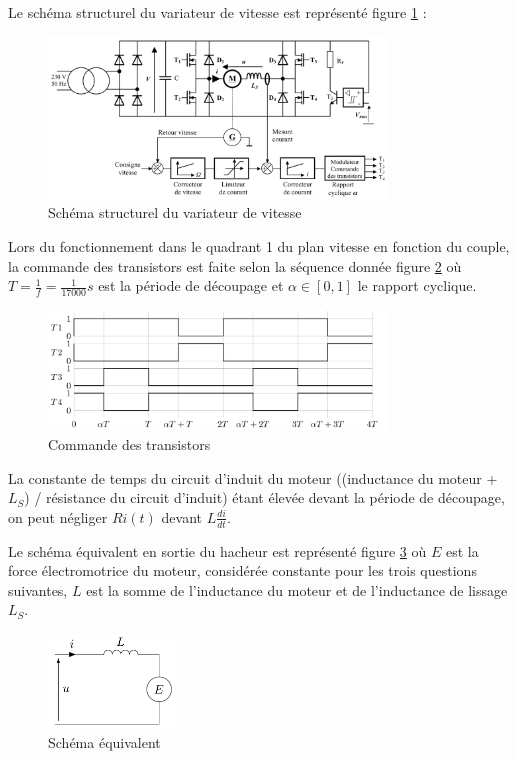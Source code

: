 Le schéma structurel du variateur de vitesse est représenté figure \ref{fig21} :

\begin{figure}[H]
\centering
\includegraphics[width=0.8\textwidth]{img/img21}
\caption{\label{fig21}Schéma structurel du variateur de vitesse}
\end{figure}

Lors du fonctionnement dans le quadrant 1 du plan vitesse en fonction du couple, la commande des transistors est faite selon la séquence donnée figure \ref{fig22} où $T = \frac{1}{f} = \frac{1}{17000} s$
est la période de découpage et $\alpha \in [0, 1]$ le rapport cyclique.

\begin{figure}[H]
\centering
\includegraphics[width=0.8\textwidth]{img/img22}
\caption{\label{fig22}Commande des transistors}
\end{figure}

La constante de temps du circuit d'induit du moteur ((inductance du moteur + $L_S$) / résistance du circuit d'induit) étant élevée devant la période de découpage, on peut négliger $Ri(t)$ devant $L\frac{di}{dt}$.

\newpage

Le schéma équivalent en sortie du hacheur est représenté figure \ref{fig23} où $E$ est la force électromotrice du moteur, considérée constante pour les trois questions suivantes, $L$ est la somme de l'inductance du moteur et de l'inductance de lissage $L_S$.

\begin{figure}[H]
\centering
\includegraphics[width=0.3\textwidth]{img/img23}
\caption{\label{fig23}Schéma équivalent}
\end{figure}

